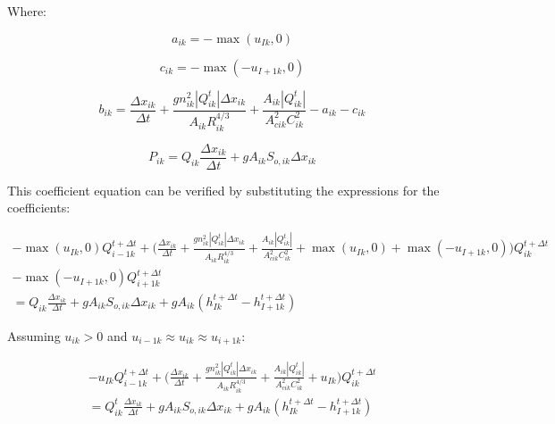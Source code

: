 \documentclass[11pt]{article}
\begin{document}
Where:

\begin{equation}
  \boxed{
  a_{ik} = - \max(u_{Ik}, 0)
  }
\end{equation}

\begin{equation}
  \boxed{
  c_{ik} = - \max(-u_{I+1k}, 0)
  }
\end{equation}

\begin{equation}
  \boxed{
  b_{ik} = \frac{\Delta x_{ik}}{\Delta t} + \frac{g n_{ik}^2 |Q_{ik}^t| \Delta x_{ik}}{A_{ik} R_{ik}^{4/3}} + \frac{A_{ik} |Q_{ik}^t|}{A_{cik}^2 C_{ik}^2} - a_{ik} - c_{ik}
  }
\end{equation}

\begin{equation}
  \boxed{
  P_{ik} = Q_{ik} \frac{\Delta x_{ik}}{\Delta t} + g A_{ik} S_{o,ik} \Delta x_{ik}
  }
\end{equation}

This coefficient equation can be verified by substituting the expressions for
the coefficients:

\begin{equation}
  \begin{split}
    - \max(u_{Ik}, 0) Q_{i - 1k}^{t + \Delta t} + \biggl(\frac{\Delta x_{ik}}{\Delta t} + \frac{g n_{ik}^2 |Q_{ik}^t| \Delta x_{ik}}{A_{ik} R_{ik}^{4/3}} + \frac{A_{ik} |Q_{ik}^t|}{A_{cik}^2 C_{ik}^2} + \max(u_{Ik}, 0) + \max(-u_{I+1k}, 0) \biggr) Q_{ik}^{t + \Delta t} \\ - \max(-u_{I+1k}, 0) Q_{i + 1k}^{t + \Delta t} \\ =
    Q_{ik} \frac{\Delta x_{ik}}{\Delta t} + g A_{ik} S_{o,ik} \Delta x_{ik} + g A_{ik} (h_{Ik}^{t + \Delta t} - h_{I+1k}^{t + \Delta t})
  \end{split}
\end{equation}

Assuming $u_{ik} > 0$ and $u_{i-1k} \approx u_{ik} \approx u_{i+1k}$:

\begin{equation}
  \begin{split}
    -u_{Ik} Q_{i - 1k}^{t + \Delta t} + \biggl(\frac{\Delta x_{ik}}{\Delta t} + \frac{g n_{ik}^2 |Q_{ik}^t| \Delta x_{ik}}{A_{ik} R_{ik}^{4/3}} + \frac{A_{ik} |Q_{ik}^t|}{A_{cik}^2 C_{ik}^2} + u_{Ik} \biggr) Q_{ik}^{t + \Delta t} \\ =
    Q_{ik}^t \frac{\Delta x_{ik}}{\Delta t} + g A_{ik} S_{o,ik} \Delta x_{ik} + g A_{ik} (h_{Ik}^{t + \Delta t} - h_{I+1k}^{t + \Delta t})
  \end{split}
\end{equation}
\end{document}
